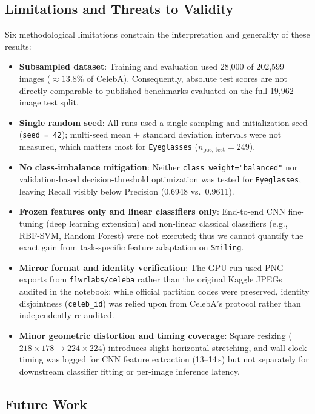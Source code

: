 \documentclass[12pt,a4paper]{article}
\newcommand{\code}[1]{\texttt{#1}}
\begin{document}
\subsection{Limitations and Threats to Validity}
\label{subsec:limitations}

Six methodological limitations constrain the interpretation and generality of these results:
\begin{itemize}[leftmargin=18pt, itemsep=2pt]
  \item \textbf{Subsampled dataset}: Training and evaluation used 28,000 of 202,599 images ($\approx 13.8\%$ of CelebA). Consequently, absolute test scores are not directly comparable to published benchmarks evaluated on the full 19,962-image test split.
  \item \textbf{Single random seed}: All runs used a single sampling and initialization seed (\code{seed = 42}); multi-seed mean $\pm$ standard deviation intervals were not measured, which matters most for \code{Eyeglasses} ($n_{\text{pos, test}} = 249$).
  \item \textbf{No class-imbalance mitigation}: Neither \code{class\_\allowbreak{}weight="balanced"} nor validation-based decision-threshold optimization was tested for \code{Eyeglasses}, leaving Recall visibly below Precision (0.6948 vs.\ 0.9611).
  \item \textbf{Frozen features only and linear classifiers only}: End-to-end CNN fine-tuning (deep learning extension) and non-linear classical classifiers (e.g., RBF-SVM, Random Forest) were not executed; thus we cannot quantify the exact gain from task-specific feature adaptation on \code{Smiling}.
  \item \textbf{Mirror format and identity verification}: The GPU run used PNG exports from \code{flwrlabs/\allowbreak{}celeba} rather than the original Kaggle JPEGs audited in the notebook; while official partition codes were preserved, identity disjointness (\code{celeb\_\allowbreak{}id}) was relied upon from CelebA's protocol rather than independently re-audited.
  \item \textbf{Minor geometric distortion and timing coverage}: Square resizing ($218 \times 178 \to 224 \times 224$) introduces slight horizontal stretching, and wall-clock timing was logged for CNN feature extraction (13--14\,s) but not separately for downstream classifier fitting or per-image inference latency.
\end{itemize}

\subsection{Future Work}
\label{subsec:future_work}
\end{document}
